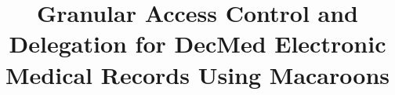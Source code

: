 \documentclass[conference,a4paper,english]{IEEEtran}
\begin{document}
\title{Granular Access Control and Delegation for DecMed Electronic Medical Records Using Macaroons}



\maketitle







\printbibliography[title={References}]
\end{document}
